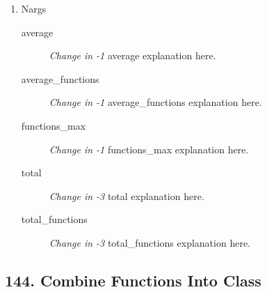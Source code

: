 \begin{enumerate}
\begin{description}
        \end{description}
  \item Nargs
        \begin{description}
          \item [average] \textit{Change in -1} average explanation here.
          \item [average\_functions] \textit{Change in -1} average\_functions explanation here.
          \item [functions\_max] \textit{Change in -1} functions\_max explanation here.
          \item [total] \textit{Change in -3} total explanation here.
          \item [total\_functions] \textit{Change in -3} total\_functions explanation here.
        \end{description}
\end{enumerate}
\subsection{ 144.  Combine Functions Into Class }

